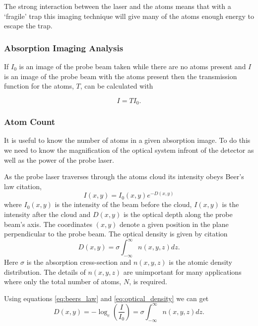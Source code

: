 The strong interaction between the laser and the atoms means that with a `fragile' trap this imaging technique will give many of the atoms enough energy to escape the trap.

\subsubsection{Absorption Imaging Analysis}

If $I_0$ is an image of the probe beam taken while there are no atoms present and $I$ is an image of the probe beam with the atoms present then the transmission function for the atoms, $T$, can be calculated with

\begin{equation}\label{eq:transmission_function_1}
I = T I_0.
\end{equation}

\subsubsection{Atom Count}


It is useful to know the number of atoms in a given absorption image. To do this we need to know the magnification of the optical system infront of the detector as well as the power of the probe laser.

As the probe laser traverses through the atoms cloud its intensity obeys Beer's law{\color{red} citation},
\begin{equation}\label{eq:beers_law}
I(x, y) = I_0(x, y)e^{-D(x, y)}
\end{equation}
where $I_0(x, y)$ is the intensity of the beam before the cloud, $I(x, y)$ is the intensity after the cloud and $D(x, y)$ is the optical depth along the probe beam's axis. The coordinates $(x, y)$ denote a given position in the plane perpendicular to the probe beam. The optical density is given by{\color{red} citation}
\begin{equation}\label{eq:optical_density}
D(x, y) = \sigma \int_{-\infty}^{\infty}n(x, y, z)dz.
\end{equation}
Here $\sigma$ is the absorption cress-section and $n(x, y, z)$ is the atomic density distribution. The details of $n(x, y, z)$ are unimportant for many applications where only the total number of atoms, $N$, is required.

Using equations \ref{eq:beers_law} and \ref{eq:optical_density} we can get
\begin{equation}
D(x, y) = -\log_e(\frac{I}{I_0}) = \sigma \int_{-\infty}^{\infty} n(x, y, z) dz.
\end{equation}

